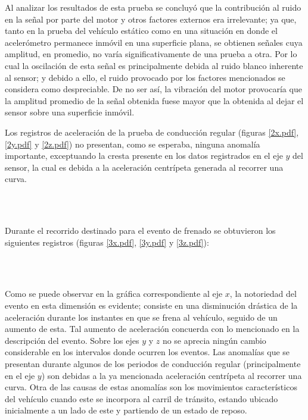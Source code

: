 Al analizar los resultados de esta prueba se concluyó que la contribución al ruido en la señal por parte del motor y otros factores externos era irrelevante; ya que, tanto en la prueba del vehículo estático como en una situación en donde el acelerómetro permanece inmóvil en una superficie plana, se obtienen señales cuya amplitud, en promedio, no varía significativamente de una prueba a otra.
Por lo cual la oscilación de esta señal es principalmente debida al ruido blanco inherente al sensor; y debido a ello, el ruido provocado por los factores mencionados se considera como despreciable.
De no ser así, la vibración del motor provocaría que la amplitud promedio de la señal obtenida fuese mayor que la obtenida al dejar el sensor sobre una superficie inmóvil.

Los registros de aceleración de la prueba de conducción regular (figuras \ref{2x.pdf}, \ref{2y.pdf} y \ref{2z.pdf}) no presentan, como se esperaba, ninguna anomalía importante, exceptuando la cresta presente en los datos registrados en el eje $y$ del sensor, la cual es debida a la aceleración centrípeta generada al recorrer una curva.
\pagebreak

\ \\
\vspace{27cm}
\pagebreak
\ \\
\vspace{10.4cm}

Durante el recorrido destinado para el evento de frenado se obtuvieron los siguientes registros (figuras \ref{3x.pdf}, \ref{3y.pdf} y \ref{3z.pdf}):
\pagebreak

\ \\
\vspace{27cm}
\pagebreak
\ \\
\vspace{10.4cm}

Como se puede observar en la gráfica correspondiente al eje $x$, la notoriedad del evento en esta dimensión es evidente; consiste en una disminución drástica de la aceleración durante los instantes en que se frena al vehículo, seguido de un aumento de esta. 
Tal aumento de aceleración concuerda con lo mencionado en la descripción del evento.
Sobre los ejes $y$ y $z$ no se aprecia ningún cambio considerable en los intervalos donde ocurren los eventos.
Las anomalías que se presentan durante algunos de los periodos de conducción regular (principalmente en el eje $y$) son debidas a la ya mencionada aceleración centrípeta al recorrer una curva.  
Otra de las causas de estas anomalías son los movimientos característicos del vehículo cuando este se incorpora al carril de tránsito, estando ubicado inicialmente a un lado de este y partiendo de un estado de reposo.\\

